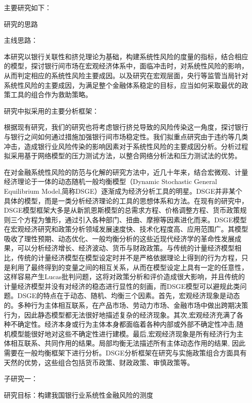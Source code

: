 主要研究如下：

研究的思路

主线思路：

本研究以银行关联性和挤兑理论为基础，构建系统性风险的度量的指标，结合相应的模型，探讨银行间市场在宏观经济体系中，面临冲击时，对系统性风险的影响，从而判定相应的系统性风险主要成因。以及研究在宏观层面，央行等监管当局针对系统性风险的主要成因，为满足整个金融体系稳定的目标，应当如何采取最优的政策工具的组合作为救助策略。

研究中拟采用的主要分析框架：

根据现有研究，我们的研究也将考虑银行挤兑导致的风险传染这一角度，探讨银行与银行之间如何通过措施加强银行间市场稳定性。我们拟重点研究由于违约等几类冲击，造成银行业风险传染的影响因素对于系统性风险的主要成因分析。分析过程拟采用基于网络模型的压力测试方法，以整合网络分析法和压力测试法的优势。

在对金融系统性风险的防范与化解的研究方法中，近几十年来，结合宏微观、计量经济理论于一体的动态随机一般均衡模型（Dynamic Stochastic General Equilibrium Model,简称DSGE）逐渐成为经济分析工具的明星。DSGE并非某个具体的模型，而是一类分析经济理论的工具的思想体系和方法。在现有的研究中，DSGE模型框架大多是从新凯恩斯模型的总需求方程、价格调整方程、货币政策规则三个方程为雏形，通过引入各种部门、扭曲、摩擦等因素进化而来。DSGE模型在宏观经济研究和政策分析领域发展速度快、技术化程度高、应用范围广。其模型吸收了理性预期、动态优化、一般均衡分析的这些近现代经济学的革命性发展成果，可以分析经济增长、经济波动、货币与财政政策。与传统的计量经济模型相比，传统的计量经济模型在模型设定时并不是严格依据理论上得到的行为方程，只是利用了最终得到的变量之间的相互关系，从而在模型设定上具有一定的任意性，这样容易产生Lucas批判问题，这将对政策分析和评价造成很大影响，并且传统的计量经济模型并没有对经济的稳态进行显性的刻画，而DSGE模型可以避规此类问题。DSGE的特点在于动态、随机、均衡三个因素。首先，宏观经济现象是动态的。多种行为主体相互联系，在产品市场、劳动力市场、金融市场中做出跨期决策行为，因此静态模型都无法很好地描述复杂的经济现象。其次,宏观经济充满了各种不确定性。经济本身或行为主体本身都面临着各种内部或外部不确定性冲击,随机模型能很好地对这些不确定性进行建模。最后,宏观经济现象是所有经济行为主体相互联系、共同作用的结果。局部均衡无法描述所有主体动态作用的结果, 因此需要在一般均衡框架下进行分析。DSGE分析框架在研究与实施政策组合方面具有天然的优势，这些组合包括货币政策、财政政策、审慎政策等。



子研究一：

研究目标：构建我国银行业系统性金融风险的测度

